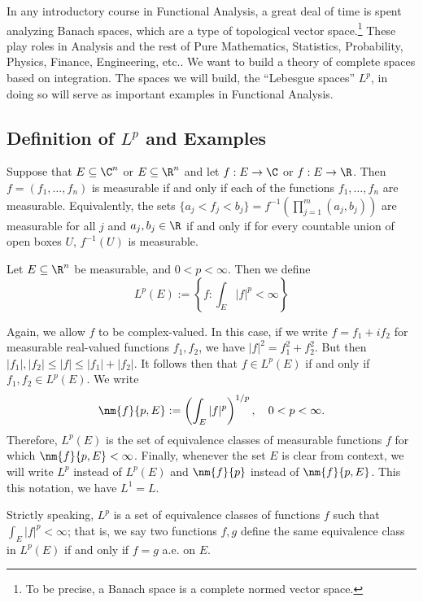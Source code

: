 In any introductory course in Functional Analysis, a great deal of time is spent analyzing Banach spaces, which are a type of topological vector space.\footnote{To be precise, a Banach space is a complete normed vector space.} These play roles in Analysis and the rest of Pure Mathematics, Statistics, Probability, Physics, Finance, Engineering, etc.. We want to build a theory of complete spaces based on integration. The spaces we will build, the ``Lebesgue spaces'' $L^p$, in doing so will serve as important examples in Functional Analysis. 



\subsection{Definition of $L^p$ and Examples}

Suppose that $E \subseteq \C^n$ or $E \subseteq \R^n$ and let $f: E \to \C$ or $f: E \to \R$. Then $f=(f_1,\ldots,f_n)$ is measurable if and only if each of the functions $f_1,\ldots,f_n$ are measurable. Equivalently, the sets $\{ a_j < f_j < b_j \} = f^{-1}(\prod_{j=1}^m (a_j,b_j))$ are measurable for all $j$ and $a_j,b_j \in \R$ if and only if for every countable union of open boxes $U$, $f^{-1}(U)$ is measurable. 


\begin{dfn}[$L^p, 0<p<\infty$]
Let $E \subseteq \R^n$ be measurable, and $0<p<\infty$. Then we define 
	\[
	L^p(E):= \left\{ f \colon \int_E |f|^p < \infty \right\}
	\]
\end{dfn}


Again, we allow $f$ to be complex-valued. In this case, if we write $f= f_1 + if_2$ for measurable real-valued functions $f_1,f_2$, we have $|f|^2= f_1^2 + f_2^2$. But then $|f_1|,|f_2| \leq |f| \leq |f_1| + |f_2|$. It follows then that $f \in L^p(E)$ if and only if $f_1,f_2 \in L^p(E)$. We write
	\[
	\nm{f}{p,E}:= \left( \int_E |f|^p \right)^{1/p}, \quad 0<p<\infty.
	\]
Therefore, $L^p(E)$ is the set of equivalence classes of measurable functions $f$ for which $\nm{f}{p,E}<\infty$. Finally, whenever the set $E$ is clear from context, we will write $L^p$ instead of $L^p(E)$ and $\nm{f}{p}$ instead of $\nm{f}{p,E}$. This this notation, we have $L^1=L$. 


\begin{rem}
Strictly speaking, $L^p$ is a set of equivalence classes of functions $f$ such that $\int_E |f|^p< \infty$; that is, we say two functions $f,g$ define the same equivalence class in $L^p(E)$ if and only if $f=g$ a.e. on $E$. 
\end{rem}


